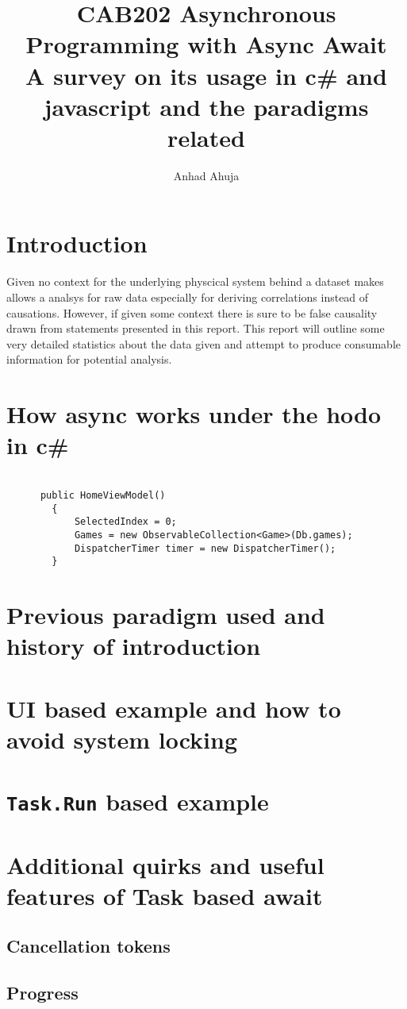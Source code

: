 \documentclass{article}
\title{CAB202 Asynchronous Programming with Async Await
\\\large A survey on its usage in c\# and javascript and the paradigms related}
\author{Anhad Ahuja}
\begin{document}
\maketitle



\section{Introduction}


Given no context for the underlying physcical system behind a dataset makes allows a analsys for raw data especially for deriving correlations instead of causations. However, if given some context there is sure to be false causality drawn from statements presented in this report. This report will outline some very detailed statistics about the data given and attempt to produce consumable information for potential analysis.

\newpage

\section{How async works under the hodo in c\#}
\begin{lstlisting}[language={[Sharp]C}]

      public HomeViewModel()
        {
            SelectedIndex = 0;
            Games = new ObservableCollection<Game>(Db.games);
            DispatcherTimer timer = new DispatcherTimer();
        }
\end{lstlisting}

\section{Previous paradigm used and history of introduction}

\section{UI based example and how to avoid system locking}

\section{\texttt{Task.Run} based example}


\section{Additional quirks and useful features of Task based await}
\subsection{Cancellation tokens}
\subsection{Progress}






\end{document}
